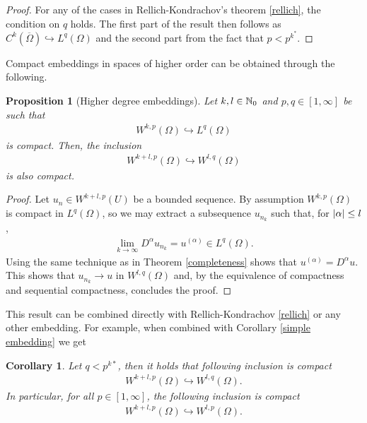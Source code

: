 \documentclass[12pt]{article}
\newtheorem{proposition}{Proposition}
\newtheorem{corollary}{Corollary}
\theoremstyle{remark}
\begin{document}
\begin{proof}
	For any of the cases in Rellich-Kondrachov's theorem \ref{rellich}, the condition on $q$ holds. The first part of the result then follows as  $C^k(\overline{\Omega}) \hookrightarrow L^q(\Omega)$ and the second part from the fact that  $p< p^{k^*}$.
\end{proof}
Compact embeddings in spaces of higher order can be obtained through the following.
\begin{proposition}[Higher degree embeddings]
	Let  $k,l \in \mathbb{N}_0$ and $p,q \in [1,\infty]$ be such that
	\begin{align*}
		W^{k,p}(\Omega)\hookrightarrow L^q(\Omega)
	\end{align*}
	is compact. Then, the inclusion
	\begin{align*}
		W^{k+l,p}(\Omega)\hookrightarrow W^{l,q}(\Omega)
	\end{align*}
	is also compact.
\end{proposition}
\begin{proof}
	Let $u_n \in W^{k+l,p}(U)$ be a bounded sequence. By assumption $ W^{k,p}(\Omega)$ is compact in  $L^q(\Omega)$, so we may extract a subsequence $u_{n_k}$ such that, for  $\left| \alpha \right| \leq l $,
	\begin{align*}
		\lim_{k \to \infty}D^\alpha u_{n_k} = u^{(\alpha)} \in L^q(\Omega) .
	\end{align*}
	Using the same technique as in Theorem \ref{completeness} shows that $u^{(\alpha)}= D^{\alpha}u$. This shows that $u_{n_k} \to u$ in $W^{l,q}(\Omega)$ and, by the equivalence of compactness and sequential compactness, concludes the proof.
\end{proof}
This result can be combined directly with Rellich-Kondrachov \ref{rellich} or any other embedding. For example, when combined with Corollary \ref{simple embedding} we get
\begin{corollary}
	Let $q< p^{k*}$, then it holds that following inclusion is compact
	\begin{align*}
		W^{k+l,p}(\Omega) \hookrightarrow W^{l,q}(\Omega).
	\end{align*}
	In particular, for all $p \in [1, \infty]$, the following inclusion is compact
	\begin{align*}
		W^{k+l,p}(\Omega) \hookrightarrow W^{l,p}(\Omega).
	\end{align*}
\end{corollary}
\end{document}
